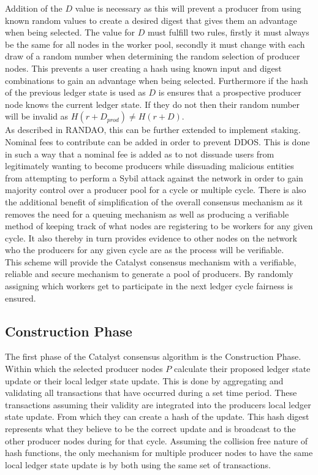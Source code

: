 \documentclass{article}
\begin{document}
Addition of the $D$ value is necessary as this will prevent a producer from using known random values to create a desired digest that gives them an advantage when being selected. The value for $D$ must fulfill two rules, firstly it must always be the same for all nodes in the worker pool, secondly it must change with each draw of a random number when determining the random selection of producer nodes. This prevents a user creating a hash using known input and digest combinations to gain an advantage when being selected. Furthermore if the hash of the previous ledger state is used as $D$ is ensures that a prospective producer node knows the current ledger state. If they do not then their random number will be invalid as $H(r + D_{prod}) \neq H(r + D)$. \\

As described in RANDAO, this can be further extended to implement staking. Nominal fees to contribute can be added in order to prevent DDOS. This is done in such a way that a nominal fee is added as to not dissuade users from legitimately wanting to become producers while dissuading malicious entities from attempting to perform a Sybil attack against the network in order to gain majority control over a producer pool for a cycle or multiple cycle. There is also the additional benefit of simplification of the overall consensus mechanism as it removes the need for a queuing mechanism as well as producing a verifiable method of keeping track of what nodes are registering to be workers for any given cycle. It also thereby in turn provides evidence to other nodes on the network who the producers for any given cycle are as the process will be verifiable. \\

This scheme will provide the Catalyst consensus mechanism with a verifiable, reliable and secure mechanism to generate a pool of producers. By randomly assigning which workers get to participate in the next ledger cycle fairness is ensured. \\




\subsection{Construction Phase}

The first phase of the Catalyst consensus algorithm is the Construction Phase. Within which the selected producer nodes  $P$ calculate their proposed ledger state update or their local ledger state update. This is done by aggregating and validating all transactions that have occurred during a set time period. These transactions assuming their validity are integrated into the producers local ledger state update. From which they can create a hash of the update. This hash digest represents what they believe to be the correct update and is broadcast to the other producer nodes during for that cycle. Assuming the collision free nature of hash functions, the only mechanism for multiple producer nodes to have the same local ledger state update is by both using the same set of transactions. \\
\end{document}
